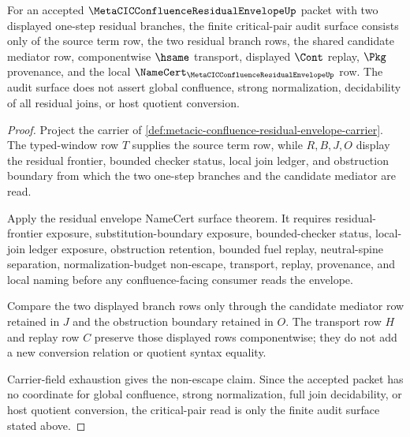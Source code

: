 \begin{theorem}
\label{thm:metacic-confluence-residual-critical-pair}
For an accepted $\MetaCICConfluenceResidualEnvelopeUp$ packet with two displayed one-step residual branches, the finite critical-pair audit surface consists only of the source term row, the two residual branch rows, the shared candidate mediator row, componentwise $\hsame$ transport, displayed $\Cont$ replay, $\Pkg$ provenance, and the local $\NameCert_{\MetaCICConfluenceResidualEnvelopeUp}$ row. The audit surface does not assert global confluence, strong normalization, decidability of all residual joins, or host quotient conversion.
\end{theorem}
\begin{proof}
Project the carrier of \autoref{def:metacic-confluence-residual-envelope-carrier}. The typed-window row $T$ supplies the source term row, while $R,B,J,O$ display the residual frontier, bounded checker status, local join ledger, and obstruction boundary from which the two one-step branches and the candidate mediator are read.

Apply the residual envelope NameCert surface theorem. It requires residual-frontier exposure, substitution-boundary exposure, bounded-checker status, local-join ledger exposure, obstruction retention, bounded fuel replay, neutral-spine separation, normalization-budget non-escape, transport, replay, provenance, and local naming before any confluence-facing consumer reads the envelope.

Compare the two displayed branch rows only through the candidate mediator row retained in $J$ and the obstruction boundary retained in $O$. The transport row $H$ and replay row $C$ preserve those displayed rows componentwise; they do not add a new conversion relation or quotient syntax equality.

Carrier-field exhaustion gives the non-escape claim. Since the accepted packet has no coordinate for global confluence, strong normalization, full join decidability, or host quotient conversion, the critical-pair read is only the finite audit surface stated above.
\end{proof}

